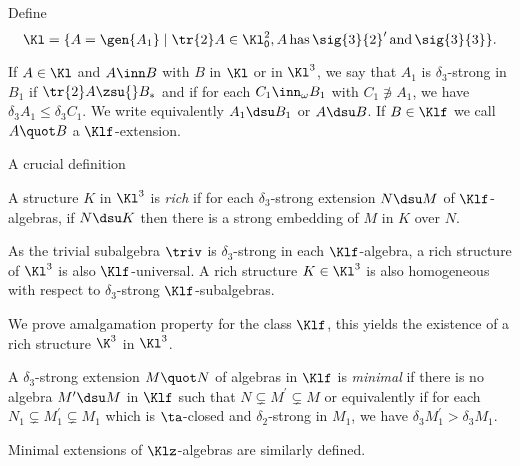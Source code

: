 Define
$$\Kl=\{A=\gen{A_{1}}\mid\tr{2}A\in\Kl^{2}_\textsf{0},A\,\text{has}\,\sig{3}{2}^{\prime}\,\text{and}\,\sig{3}{3}\}.$$

If $A\in\Kl$ and $A\inn B$ with $B$ in $\Kl$ or in $\Kl^{3}$, we say that $A_{1}$
is $\delta_{3}$-strong in $B_{1}$ if $\tr{2}A\zsu{}B_{*}$ and if for each  $C_{1}\inn_{\omega}
B_{1}$ with $C_{1}\nni A_{1}$, we have $\delta_{3}A_{1}\leq\delta_{3}C_{1}$.
We write equivalently $A_{1}\dsu B_{1}$ or $A\dsu B$. If $B\in\Klf$ we call
$A\quot B$ a $\Klf$-extension.

\medskip
A crucial definition
\begin{dfn}
A structure $K$ in $\Kl^{3}$ is \emph{rich} if for each $\delta_{3}$-strong extension $N\dsu M$ of
$\Klf$-algebras, if $N\dsu K$ then there is a strong embedding of $M$ in $K$ over $N$.
\end{dfn}

As the trivial subalgebra $\triv$ is $\delta_{3}$-strong in each $\Klf$-algebra,
a rich structure of $\Kl^{3}$ is also $\Klf$-universal. A rich structure $K\in\Kl^{3}$ is also homogeneous
with respect to $\delta_{3}$-strong $\Klf$-subalgebras.

We prove amalgamation property for the class $\Klf$, this yields the existence
of a rich structure $\K^{3}$ in $\Kl^{3}$.

\medskip
A $\delta_{3}$-strong extension $M\quot N$ of algebras in $\Klf$ is \emph{minimal} if there is no algebra
$M^{\prime}\dsu M$ in $\Klf$ such that $N\subsetneq M^{\prime}\subsetneq M$ or equivalently if for
each $N_{1}\subsetneq M^{\prime}_{1}\subsetneq M_{1}$ which is $\ta$-closed and $\delta_{2}$-strong in $M_{1}$,
we have $\delta_{3}M_{1}^{\prime}>\delta_{3}M_{1}$.

Minimal extensions of $\Klz$-algebras are similarly defined.


%
%
%

